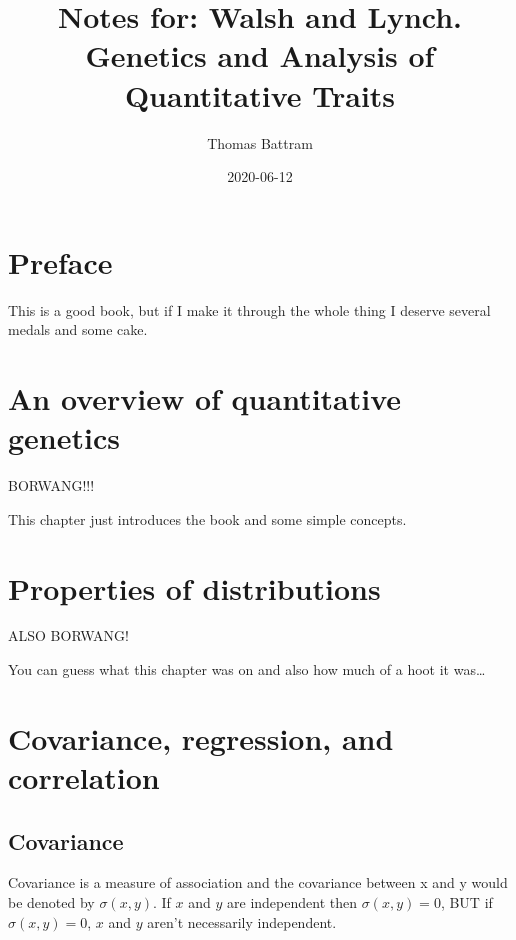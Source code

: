 \documentclass[
]{book}
\title{Notes for: Walsh and Lynch. Genetics and Analysis of Quantitative Traits}
\author{Thomas Battram}
\date{2020-06-12}
\begin{document}
\maketitle

{
\setcounter{tocdepth}{1}
\tableofcontents
}
\hypertarget{preface}{%
\chapter*{Preface}\label{preface}}

This is a good book, but if I make it through the whole thing I deserve several medals and some cake.

\hypertarget{an-overview-of-quantitative-genetics}{%
\chapter{An overview of quantitative genetics}\label{an-overview-of-quantitative-genetics}}

BORWANG!!!

This chapter just introduces the book and some simple concepts.

\hypertarget{properties-of-distributions}{%
\chapter{Properties of distributions}\label{properties-of-distributions}}

ALSO BORWANG!

You can guess what this chapter was on and also how much of a hoot it was\ldots{}

\hypertarget{covariance-regression-and-correlation}{%
\chapter{Covariance, regression, and correlation}\label{covariance-regression-and-correlation}}

\hypertarget{covariance}{%
\section{Covariance}\label{covariance}}

Covariance is a measure of association and the covariance between x and y would be denoted by \(\sigma(x, y)\). If \(x\) and \(y\) are independent then \(\sigma(x, y) = 0\), BUT if \(\sigma(x, y) = 0\), \(x\) and \(y\) aren't necessarily independent.
\end{document}

